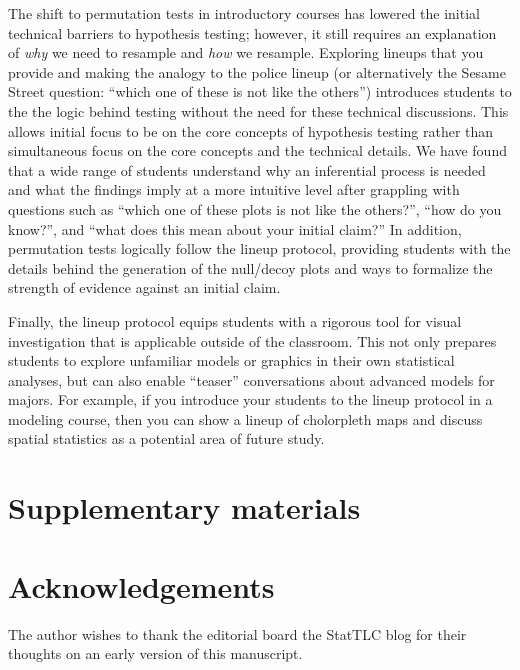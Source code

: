 \documentclass[12pt]{article}
\begin{document}
The shift to permutation tests in introductory courses has lowered the
initial technical barriers to hypothesis testing; however, it still
requires an explanation of \emph{why} we need to resample and \emph{how}
we resample. Exploring lineups that you provide and making the analogy
to the police lineup (or alternatively the Sesame Street question:
``which one of these is not like the others'') introduces students to
the the logic behind testing without the need for these technical
discussions. This allows initial focus to be on the core concepts of
hypothesis testing rather than simultaneous focus on the core concepts
and the technical details. We have found that a wide range of students
understand why an inferential process is needed and what the findings
imply at a more intuitive level after grappling with questions such as
``which one of these plots is not like the others?'', ``how do you
know?'', and ``what does this mean about your initial claim?'' In
addition, permutation tests logically follow the lineup protocol,
providing students with the details behind the generation of the
null/decoy plots and ways to formalize the strength of evidence against
an initial claim.

Finally, the lineup protocol equips students with a rigorous tool for
visual investigation that is applicable outside of the classroom. This
not only prepares students to explore unfamiliar models or graphics in
their own statistical analyses, but can also enable ``teaser''
conversations about advanced models for majors. For example, if you
introduce your students to the lineup protocol in a modeling course,
then you can show a lineup of cholorpleth maps and discuss spatial
statistics as a potential area of future study.

\hypertarget{supplementary-materials}{%
\section{Supplementary materials}\label{supplementary-materials}}

\hypertarget{acknowledgements}{%
\section{Acknowledgements}\label{acknowledgements}}

The author wishes to thank the editorial board the StatTLC blog for
their thoughts on an early version of this manuscript.



\end{document}
